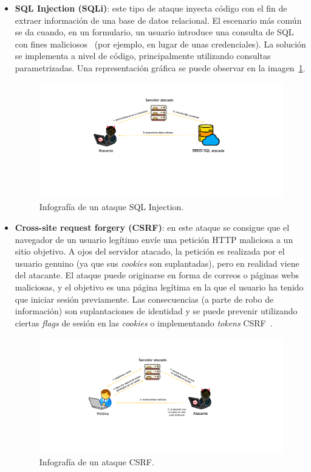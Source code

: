 \begin{itemize}
	\item \textbf{SQL Injection (SQLi)}: este tipo de ataque inyecta código con el fin de extraer información de una base de datos relacional. El escenario más común se da cuando, en un formulario, un usuario introduce una consulta de SQL con fines maliciosos~\cite{sqlIw3school} (por ejemplo, en lugar de unas credenciales). La solución se implementa a nivel de código, principalmente utilizando consultas parametrizadas. Una representación gráfica se puede observar en la imagen~\ref{img:sqli}.
	
\begin{figure}[h]
	\caption[Ataques \textit{web}: SQLi]{Infografía de un ataque SQL Injection.}
	\label{img:sqli}
	\centering
	\includegraphics[width=\textwidth]{../img/memoria/3_sqli.pdf}
\end{figure}

	\item \textbf{Cross-site request forgery (CSRF)}: en este ataque se consigue que el navegador de un usuario legítimo envíe una petición HTTP maliciosa a un sitio objetivo. A ojos del servidor atacado, la petición es realizada por el usuario genuino (ya que sus \textit{cookies} son suplantadas), pero en realidad viene del atacante. El ataque puede originarse en forma de correos o páginas webs maliciosas, y el objetivo es una página legítima en la que el usuario ha tenido que iniciar sesión previamente. Las consecuencias (a parte de robo de información) son suplantaciones de identidad y se puede prevenir utilizando ciertas \textit{flags} de sesión en las \textit{cookies} o implementando \textit{tokens} CSRF~\cite{csrfatatus}.
	
	\begin{figure}[h]
		\caption[Ataques \textit{web}: CSRF]{Infografía de un ataque CSRF.}
		\label{img:csrf}
		\centering
		\includegraphics[width=\textwidth]{../img/memoria/3_csrf.pdf}
	\end{figure}
	

\end{itemize}
